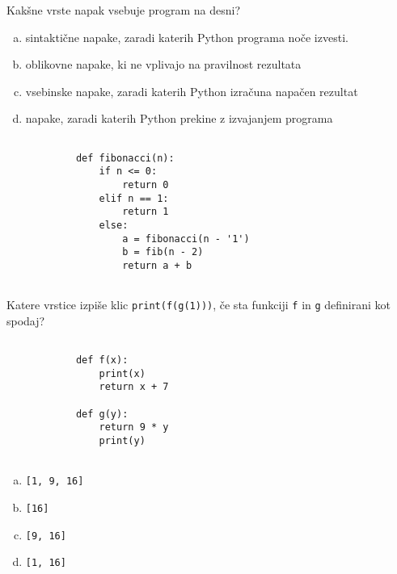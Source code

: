 \documentclass[arhiv, 10pt]{../izpit}
\newcommand{\inlinepy}[1]{\texttt{#1}}
\begin{document}
        \naloga*
        \begin{multicols}{2}
        \noindent
        Kakšne vrste napak vsebuje program na desni?

        \begin{enumerate}[(a)]
\item sintaktične napake, zaradi katerih Python programa noče izvesti.
\item oblikovne napake, ki ne vplivajo na pravilnost rezultata
\item vsebinske napake, zaradi katerih Python izračuna napačen rezultat
\item napake, zaradi katerih Python prekine z izvajanjem programa
\end{enumerate}

        \columnbreak

        \begin{verbatim}
        
            def fibonacci(n):
                if n <= 0:
                    return 0
                elif n == 1:
                    return 1
                else:
                    a = fibonacci(n - '1')
                    b = fib(n - 2)
                    return a + b
            
        \end{verbatim}

        \end{multicols}

    
        \naloga*
        Katere vrstice izpiše klic \inlinepy{print(f(g(1)))}, če sta funkciji \inlinepy{f} in \inlinepy{g} definirani kot spodaj?

        \begin{multicols}{2}
        \begin{verbatim}
        
            def f(x):
                print(x)
                return x + 7

            def g(y):
                return 9 * y
                print(y)
        
        \end{verbatim}

        \begin{enumerate}[(a)]
\item \inlinepy{[1, 9, 16]}
\item \inlinepy{[16]}
\item \inlinepy{[9, 16]}
\item \inlinepy{[1, 16]}
\end{enumerate}

        \end{multicols}
    
\end{document}
